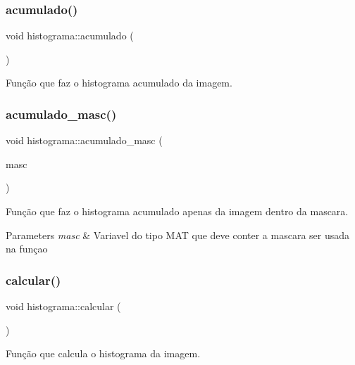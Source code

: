 \subsubsection{\texorpdfstring{acumulado()}{acumulado()}}
{\footnotesize\ttfamily void histograma\+::acumulado (\begin{DoxyParamCaption}{ }\end{DoxyParamCaption})}



Função que faz o histograma acumulado da imagem. 

\mbox{\label{classhistograma_a6ab0c9af1a0448ceb27cb6484acfb692}} 
\subsubsection{\texorpdfstring{acumulado\+\_\+masc()}{acumulado\_masc()}}
{\footnotesize\ttfamily void histograma\+::acumulado\+\_\+masc (\begin{DoxyParamCaption}\item[{Mat}]{masc }\end{DoxyParamCaption})}



Função que faz o histograma acumulado apenas da imagem dentro da mascara. 


\begin{DoxyParams}{Parameters}
{\em masc} & Variavel do tipo M\+AT que deve conter a mascara ser usada na funçao \\
\hline
\end{DoxyParams}
\mbox{\label{classhistograma_a7b1570d6a2feedd66793862d9a140d16}} 
\subsubsection{\texorpdfstring{calcular()}{calcular()}}
{\footnotesize\ttfamily void histograma\+::calcular (\begin{DoxyParamCaption}{ }\end{DoxyParamCaption})}



Função que calcula o histograma da imagem. 


